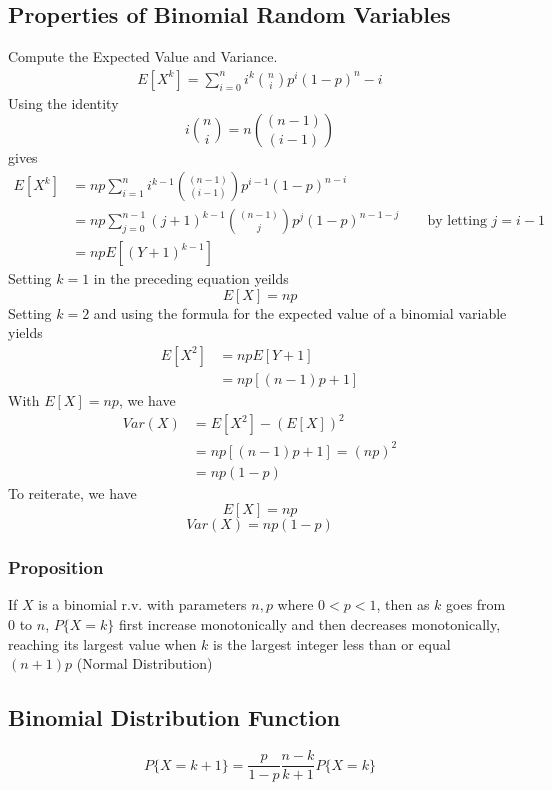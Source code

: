 \subsection{Properties of Binomial Random Variables}
Compute the Expected Value and Variance.
\begin{equation*}
    \begin{split}
        E[X^k] = \sum^n_{i = 0} i^k{n\choose i}p^i(1-p)^n-i
    \end{split}
\end{equation*}
Using the identity \[i{n\choose i} = n{(n-1)\choose (i-1)}\]
gives 
\begin{equation*}
    \begin{split}
        E[X^k] &= np \sum^n_{i=1} i^{k - 1}{(n-1)\choose (i-1)}p^{i-1}(1-p)^{n-i}\\
        &= np\sum^{n-1}_{j = 0} (j+1)^{k-1}{(n-1)\choose j}p^j(1-p)^{n-1-j}\qquad \text{by letting } j = i-1\\
        &=  npE[(Y+1)^{k-1}]
    \end{split}
\end{equation*}
Setting $k = 1$ in the preceding equation yeilds $$E[X] = np$$
Setting $k = 2$ and using the formula for the expected value of a binomial variable yields
\begin{equation*}
    \begin{split}
        E[X^2] &= npE[Y+1]\\
        &= np[(n-1)p + 1]
    \end{split}
\end{equation*}
With $E[X] = np$, we have 
\begin{equation*}
    \begin{split}
        Var(X) &= E[X^2] - (E[X])^2\\
        &= np[(n-1)p + 1] = (np)^2\\
        &= np(1-p)
    \end{split}
\end{equation*}
To reiterate, we have \[E[X] = np\] \[Var(X) = np(1-p)\]
\subsubsection{Proposition}
If $X$ is a binomial r.v. with parameters $n,p$ where $0<p<1$, then as $k$ goes from 0 to $n$, $P\{X = k\}$ first increase monotonically and then decreases monotonically, reaching its largest value when $k$ is the largest integer less than or equal $(n+1)p$ (Normal Distribution)
\subsection{Binomial Distribution Function}
\[P\{X = k + 1\} = \frac{p}{1-p}\frac{n-k}{k+1}P\{X = k\}\]
